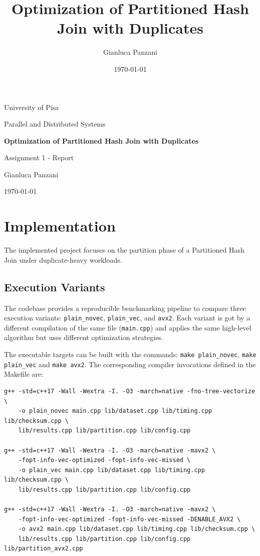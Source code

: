 \documentclass[11pt,a4paper]{article}
\title{Optimization of Partitioned Hash Join with Duplicates}
\author{Gianluca Panzani}
\date{\today}
\begin{document}
\begin{titlepage}
    \centering
    {\Large University of Pisa\par}
    \vspace{0.6cm}
    {\large Parallel and Distributed Systems\par}
    \vspace{2.0cm}
    {\LARGE \textbf{Optimization of Partitioned Hash Join with Duplicates}\par}
    \vspace{1.2cm}
    {\large Assignment 1 - Report\par}
    \vfill
    {\large Gianluca Panzani\par}
    \vspace{0.3cm}
    {\large \today\par}
\end{titlepage}

\tableofcontents
\newpage
{}


\section{Implementation}
The implemented project focuses on the partition phase of a Partitioned Hash Join under duplicate-heavy workloads.

\subsection{Execution Variants}
The codebase provides a reproducible benchmarking pipeline to compare three execution variants: \texttt{plain\_novec}, 
\texttt{plain\_vec}, and \texttt{avx2}. Each variant is got by a different compilation of the same file (\texttt{main.cpp}) 
and applies the same high-level algorithm but uses different optimization strategies.

The executable targets can be built with the commands: \texttt{make plain\_novec}, \texttt{make plain\_vec} and \texttt{make avx2}. 
The corresponding compiler invocations defined in the Makefile are:
\begin{verbatim}
g++ -std=c++17 -Wall -Wextra -I. -O3 -march=native -fno-tree-vectorize \
    -o plain_novec main.cpp lib/dataset.cpp lib/timing.cpp lib/checksum.cpp \
    lib/results.cpp lib/partition.cpp lib/config.cpp

g++ -std=c++17 -Wall -Wextra -I. -O3 -march=native -mavx2 \
    -fopt-info-vec-optimized -fopt-info-vec-missed \
    -o plain_vec main.cpp lib/dataset.cpp lib/timing.cpp lib/checksum.cpp \
    lib/results.cpp lib/partition.cpp lib/config.cpp

g++ -std=c++17 -Wall -Wextra -I. -O3 -march=native -mavx2 \
    -fopt-info-vec-optimized -fopt-info-vec-missed -DENABLE_AVX2 \
    -o avx2 main.cpp lib/dataset.cpp lib/timing.cpp lib/checksum.cpp \
    lib/results.cpp lib/partition.cpp lib/config.cpp lib/partition_avx2.cpp
\end{verbatim}
\end{document}
